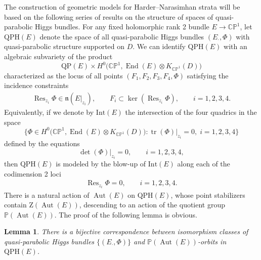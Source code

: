 \documentclass[pdftex]{sigma}
\newcommand{\field}[1]{\ensuremath{\mathbb{#1}}}
\newcommand{\CC}{\field{C}}
\newcommand{\PP}{\field{P}}
\newcommand{\qp}{\boldsymbol{\cdot}}
\DeclareMathOperator{\Aut}{Aut}
\DeclareMathOperator{\End}{End}
\DeclareMathOperator{\Res}{Res}
\DeclareMathOperator{\tr}{tr}
\numberwithin{equation}{section}
\newtheorem{Lemma}[Theorem]{Lemma}
\begin{document}
The construction of geometric models for Harder--Narasimhan strata will be based on the following series of results on the structure of spaces of quasi-parabolic Higgs bundles. For any fixed holomorphic rank 2 bundle $E\rightarrow \CC\PP^{1}$, let $\mathrm{QPH}(E)$ denote the space of all quasi-parabolic Higgs bundles $(E_{\qp},\Phi)$ with quasi-parabolic structure supported on $D$. We can identify $\mathrm{QPH}(E)$ with an algebraic subvariety of the product
\[
\mathrm{QP}(E)\times H^{0}\bigl(\CC\PP^{1},\End(E)\otimes K_{\CC\PP^{1}}(D)\bigr)
\]
characterized as the locus of all points $(F_{1},F_{2},F_{3},F_{4},\Phi)$ satisfying the incidence constraints
\begin{gather*}%
\Res_{z_{i}}\Phi\in\mathfrak{n}(E\vert_{z_{i}}),\qquad
F_{i}\subset\ker (\Res_{z_{i}}\Phi),\qquad
i=1,2,3,4.
\end{gather*}
Equivalently, if we denote by $\mathrm{Int}(E)$ the intersection of the four quadrics in the space
\[
\bigl\{ \Phi \in H^{0}\big(\CC\PP^{1},\End(E)\otimes K_{\CC\PP^{1}}(D)\big)\colon \tr(\Phi)\vert_{z_{i}}=0,\; i=1,2,3,4\bigr\}
\]
defined by the equations
\[
\det(\Phi)\vert_{z_{i}} =0,\qquad i=1,2,3,4,
\]
then $\mathrm{QPH}(E)$ is modeled by the blow-up of $\mathrm{Int}(E)$ along each of the codimension 2 loci
\begin{gather}\label{eq:blow-up-loci}
\Res_{z_{i}}\Phi =0,\qquad i=1,2,3,4.
\end{gather}
There is a natural action of $\Aut(E)$ on $\mathrm{QPH}(E)$, whose point stabilizers contain $\mathrm{Z}(\Aut(E))$, descending to an action of the quotient group $\PP(\Aut(E))$. The proof of the following lemma is obvious.

\begin{Lemma}%
There is a bijective correspondence between isomorphism classes of quasi-parabolic Higgs bundles $\{(E_{\qp},\Phi)\}$ and $\PP(\Aut(E))$-orbits in $\mathrm{QPH}(E)$.
\end{Lemma}
\end{document}
